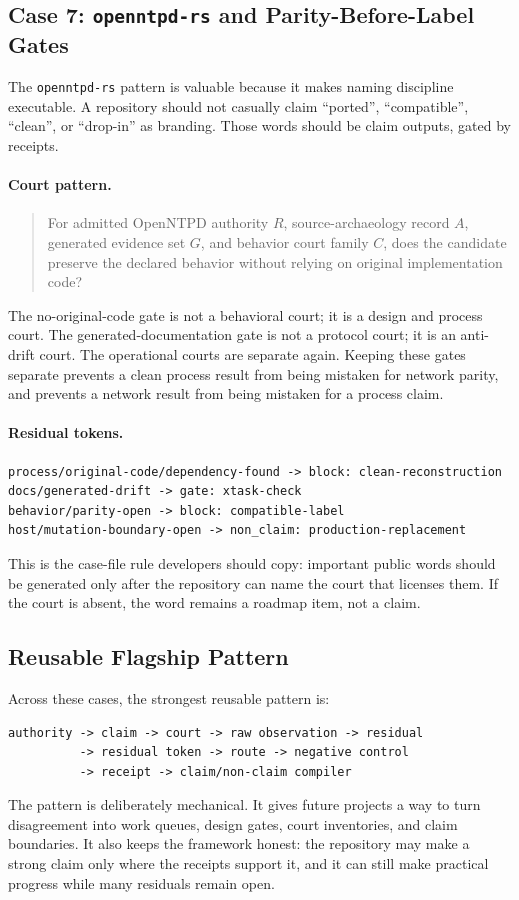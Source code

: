 \documentclass[11pt,a4paper]{article}
\begin{document}
\subsection{Case 7: \texttt{openntpd-rs} and Parity-Before-Label Gates}

The \texttt{openntpd-rs} pattern is valuable because it makes naming discipline executable. A repository should not casually claim ``ported'', ``compatible'', ``clean'', or ``drop-in'' as branding. Those words should be claim outputs, gated by receipts.

\paragraph{Court pattern.}
\begin{quote}
For admitted OpenNTPD authority \(R\), source-archaeology record \(A\), generated evidence set \(G\), and behavior court family \(C\), does the candidate preserve the declared behavior without relying on original implementation code?
\end{quote}
The no-original-code gate is not a behavioral court; it is a design and process court. The generated-documentation gate is not a protocol court; it is an anti-drift court. The operational courts are separate again. Keeping these gates separate prevents a clean process result from being mistaken for network parity, and prevents a network result from being mistaken for a process claim.

\paragraph{Residual tokens.}
\begin{verbatim}
process/original-code/dependency-found -> block: clean-reconstruction
docs/generated-drift -> gate: xtask-check
behavior/parity-open -> block: compatible-label
host/mutation-boundary-open -> non_claim: production-replacement
\end{verbatim}
This is the case-file rule developers should copy: important public words should be generated only after the repository can name the court that licenses them. If the court is absent, the word remains a roadmap item, not a claim.

\subsection{Reusable Flagship Pattern}

Across these cases, the strongest reusable pattern is:
\begin{verbatim}
authority -> claim -> court -> raw observation -> residual
          -> residual token -> route -> negative control
          -> receipt -> claim/non-claim compiler
\end{verbatim}
The pattern is deliberately mechanical. It gives future projects a way to turn disagreement into work queues, design gates, court inventories, and claim boundaries. It also keeps the framework honest: the repository may make a strong claim only where the receipts support it, and it can still make practical progress while many residuals remain open.
\end{document}
